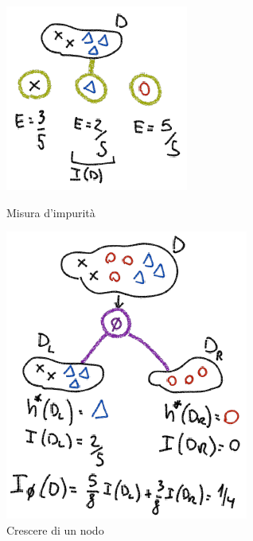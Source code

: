 	\begin{figure}
		\centering
		\begin{minipage}{.5\textwidth}
			\centering
			\includegraphics[width=0.6\linewidth]{imgs/chapter5/img3}
			\caption{Misura d'impurit\`a}
			\label{fig:chapter05-03}
		\end{minipage}%
		\begin{minipage}{.5\textwidth}
			\centering
			\includegraphics[width=0.6\linewidth]{imgs/chapter5/img4}
			\caption{Crescere di un nodo}
			\label{fig:chapter05-04}
		\end{minipage}
	\end{figure}

